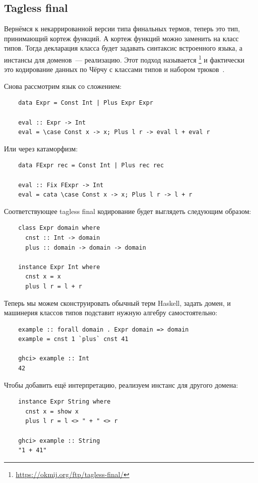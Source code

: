 \subsection{Tagless final}

Вернёмся к некаррированной версии типа финальных термов, теперь это тип, принимающий кортеж функций.
А кортеж функций можно заменить на класс типов.
Тогда декларация класса будет задавать синтаксис встроенного языка, а инстансы для доменов~--- реализацию.
Этот подход называется \footnote{\url{https://okmij.org/ftp/tagless-final/}} и фактически это кодирование данных по Чёрчу с классами типов и набором трюков~\cite{carette2007finally, kiselyov2012typed}.

Снова рассмотрим язык со сложением:
\begin{verbatim}
    data Expr = Const Int | Plus Expr Expr

    eval :: Expr -> Int
    eval = \case Const x -> x; Plus l r -> eval l + eval r
\end{verbatim}
Или через катаморфизм:
\begin{verbatim}
    data FExpr rec = Const Int | Plus rec rec

    eval :: Fix FExpr -> Int
    eval = cata \case Const x -> x; Plus l r -> l + r
\end{verbatim}
Соответствующее tagless final кодирование будет выглядеть следующим образом:
\begin{verbatim}
    class Expr domain where
      cnst :: Int -> domain
      plus :: domain -> domain -> domain

    instance Expr Int where
      cnst x = x
      plus l r = l + r
\end{verbatim}

Теперь мы можем сконструировать обычный терм Haskell, задать домен, и машинерия классов типов подставит нужную алгебру самостоятельно:
\begin{verbatim}
    example :: forall domain . Expr domain => domain
    example = cnst 1 `plus` cnst 41

    ghci> example :: Int
    42
\end{verbatim}

Чтобы добавить ещё интерпретацию, реализуем инстанс для другого домена:
\begin{verbatim}
    instance Expr String where
      cnst x = show x
      plus l r = l <> " + " <> r

    ghci> example :: String
    "1 + 41"
\end{verbatim}

